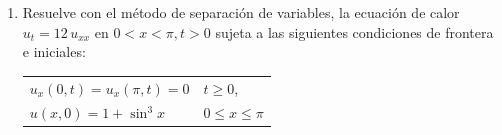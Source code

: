 \documentclass[hidelinks,12pt]{article}
\def\scaleint#1{\vcenter{\hbox{\scaleto[3ex]{\displaystyle\int}{#1}}}}
\def\bs{\mkern-12mu}
\begin{document}
\begin{enumerate}
Recordemos la definición de la función Beta:
\begin{align*}
    B (p, q) = \scaleint{6ex}_{\bs 0}^{1} t^{p-1} \, (1 - t)^{q-1} \dd{t}
\end{align*}
Comparando con la integral obtenida, se identifican los parámetros:
\begin{align*}
    p - 1 &= \dfrac{1}{2} \quad \Rightarrow \quad p = \dfrac{3}{2} \\[0.5em]
    q - 1 &= -\dfrac{1}{3} \quad \Rightarrow \quad q = \dfrac{2}{3}
\end{align*}
Por tanto:
\begin{align*}
    I = \dfrac{1}{4} \, B \left(\dfrac{3}{2}, \dfrac{2}{3} \right)
\end{align*}
La función Beta se expresa en términos de la función Gamma mediante:
\begin{align*}
    B (p, q) = \dfrac{\Gamma (p) \, \Gamma (q)}{\Gamma(p + q)}
\end{align*}
Aplicando esta relación:
\begin{align*}
    I = \dfrac{1}{4} \, \dfrac{\Gamma \left( \dfrac{3}{2} \right) \, \Gamma \left( \dfrac{2}{3} \right)}{\Gamma \left(\dfrac{13}{6}\right)}
\end{align*}
Se utiliza el valor conocido de la función Gamma:
\begin{align*}
    \Gamma \left( \dfrac{3}{2} \right) = \dfrac{\sqrt{\pi}}{2}
\end{align*}
Sustituyendo:
\begin{align*}
    I &= \dfrac{1}{4} \cdot \dfrac{\dfrac{\sqrt{\pi}}{2} \, \Gamma \left( \dfrac{2}{3} \right)}{\Gamma \left( \dfrac{13}{6} \right)} \\[0.5em]
    &= \dfrac{\sqrt{\pi}}{8} \, \dfrac{\Gamma \left( \dfrac{2}{3} \right)}{\Gamma \left( \dfrac{13}{6} \right)}
\end{align*}
Se concluye que:
\begin{align*}
    \boxed{\scaleint{6ex}_{\bs 0}^{1} \dfrac{x^{5}}{\sqrt[3]{1 - x^{4}}} \dd{x} = \dfrac{\sqrt{\pi}}{8} \, \dfrac{\Gamma \left( \dfrac{2}{3} \right)}{\Gamma \left(\dfrac{13}{6} \right)}}
\end{align*}

\item Resuelve con el método de separación de variables, la ecuación de calor $u_{t} = 12 \, u_{xx}$ en $0 < x < \pi, t > 0$ sujeta a las siguientes condiciones de frontera e iniciales:
\begin{table}[H]
\centering
\begin{tabular}{l l}
$u_{x} (0, t) = u_{x} (\pi, t) = 0$ & $t \geq 0$, \\
$u(x, 0) = 1 + \sin^{3} x$ & $0 \leq x \leq \pi$
\end{tabular}
\end{table}
\end{enumerate}
\end{document}
